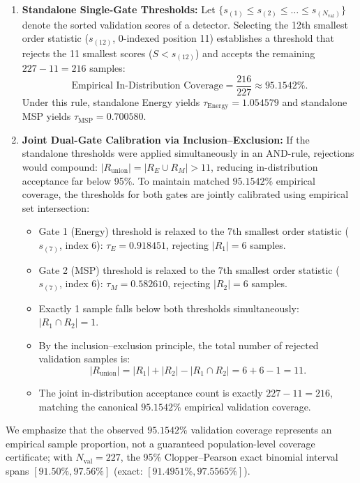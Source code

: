 \begin{enumerate}
\item \textbf{Standalone Single-Gate Thresholds:} Let $\{s_{(1)} \le s_{(2)} \le \dots \le s_{(N_{\text{val}})}\}$ denote the sorted validation scores of a detector. Selecting the 12th smallest order statistic ($s_{(12)}$, 0-indexed position 11) establishes a threshold that rejects the 11 smallest scores ($S < s_{(12)}$) and accepts the remaining $227 - 11 = 216$ samples:
\begin{equation}
\text{Empirical In-Distribution Coverage} = \frac{216}{227} \approx 95.1542\%.
\end{equation}
Under this rule, standalone Energy yields $\tau_{\text{Energy}} = 1.054579$ and standalone MSP yields $\tau_{\text{MSP}} = 0.700580$.
\item \textbf{Joint Dual-Gate Calibration via Inclusion--Exclusion:} If the standalone thresholds were applied simultaneously in an AND-rule, rejections would compound: $|R_{\text{union}}| = |R_E \cup R_M| > 11$, reducing in-distribution acceptance far below 95\%. To maintain matched $95.1542\%$ empirical coverage, the thresholds for both gates are jointly calibrated using empirical set intersection:
\begin{itemize}
\item Gate 1 (Energy) threshold is relaxed to the 7th smallest order statistic ($s_{(7)}$, index 6): $\tau_E = 0.918451$, rejecting $|R_1| = 6$ samples.
\item Gate 2 (MSP) threshold is relaxed to the 7th smallest order statistic ($s_{(7)}$, index 6): $\tau_M = 0.582610$, rejecting $|R_2| = 6$ samples.
\item Exactly 1 sample falls below both thresholds simultaneously: $|R_1 \cap R_2| = 1$.
\item By the inclusion--exclusion principle, the total number of rejected validation samples is:
\begin{equation}
|R_{\text{union}}| = |R_1| + |R_2| - |R_1 \cap R_2| = 6 + 6 - 1 = 11.
\end{equation}
\item The joint in-distribution acceptance count is exactly $227 - 11 = 216$, matching the canonical $95.1542\%$ empirical validation coverage.
\end{itemize}
\end{enumerate}

We emphasize that the observed $95.1542\%$ validation coverage represents an empirical sample proportion, not a guaranteed population-level coverage certificate; with $N_{\text{val}} = 227$, the 95\% Clopper--Pearson exact binomial interval spans $[91.50\%, 97.56\%]$ (exact: $[91.4951\%, 97.5565\%]$).

